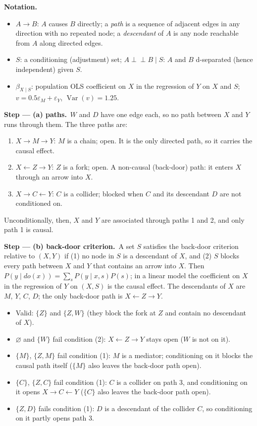 \documentclass[11pt,a4paper]{article}
\newenvironment{notacao}{\par\smallskip\noindent\textbf{Notation.}\begin{itemize}[leftmargin=1.4em,topsep=1pt,itemsep=0pt]\small}{\end{itemize}}
\newcommand{\passo}[2]{\par\smallskip\noindent\textbf{Step --- #1.}~#2}
\begin{document}
\begin{sol}
\begin{notacao}
\item $A\to B$: $A$ causes $B$ directly; a \emph{path} is a sequence of adjacent edges in any direction
with no repeated node; a \emph{descendant} of $A$ is any node reachable from $A$ along directed edges.
\item $S$: a conditioning (adjustment) set; $A\perp\!\!\!\perp B\mid S$: $A$ and $B$ d-separated
(hence independent) given $S$.
\item $\beta_{X\mid S}$: population OLS coefficient on $X$ in the regression of $Y$ on $X$ and $S$;
$v=0.5\varepsilon_M+\varepsilon_Y$, $\operatorname{Var}(v)=1.25$.
\end{notacao}

\passo{(a) paths}{$W$ and $D$ have one edge each, so no path between $X$ and $Y$ runs through them.
The three paths are:
\begin{enumerate}[label=\arabic*.,leftmargin=2em]
\item $X\to M\to Y$: $M$ is a chain; open. It is the only directed path, so it carries the causal effect.
\item $X\leftarrow Z\to Y$: $Z$ is a fork; open. A non-causal (back-door) path: it enters $X$ through an arrow into $X$.
\item $X\to C\leftarrow Y$: $C$ is a collider; blocked when $C$ and its descendant $D$ are not conditioned on.
\end{enumerate}
Unconditionally, then, $X$ and $Y$ are associated through paths 1 and 2, and only path 1 is causal.}

\passo{(b) back-door criterion}{A set $S$ satisfies the back-door criterion relative to $(X,Y)$ if
(1) no node in $S$ is a descendant of $X$, and (2) $S$ blocks every path between $X$ and $Y$ that contains an
arrow into $X$. Then $P(y\mid do(x))=\sum_sP(y\mid x,s)P(s)$; in a linear model the coefficient on $X$ in the
regression of $Y$ on $(X,S)$ is the causal effect. The descendants of $X$ are $M$, $Y$, $C$, $D$; the only
back-door path is $X\leftarrow Z\to Y$.
\begin{itemize}[leftmargin=1.4em]
\item Valid: $\{Z\}$ and $\{Z,W\}$ (they block the fork at $Z$ and contain no descendant of $X$).
\item $\varnothing$ and $\{W\}$ fail condition (2): $X\leftarrow Z\to Y$ stays open ($W$ is not on it).
\item $\{M\}$, $\{Z,M\}$ fail condition (1): $M$ is a mediator; conditioning on it blocks the causal path
itself ($\{M\}$ also leaves the back-door path open).
\item $\{C\}$, $\{Z,C\}$ fail condition (1): $C$ is a collider on path 3, and conditioning on it opens
$X\to C\leftarrow Y$ ($\{C\}$ also leaves the back-door path open).
\item $\{Z,D\}$ fails condition (1): $D$ is a descendant of the collider $C$, so conditioning on it partly opens path 3.
\end{itemize}}


\end{sol}
\end{document}
